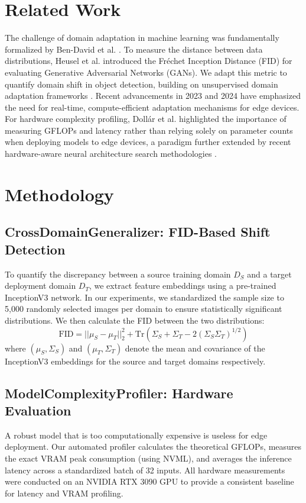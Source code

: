 \documentclass[conference]{IEEEtran}
\begin{document}
\section{Related Work}
The challenge of domain adaptation in machine learning was fundamentally formalized by Ben-David et al. \cite{ben2010theory}. To measure the distance between data distributions, Heusel et al. \cite{heusel2017gans} introduced the Fréchet Inception Distance (FID) for evaluating Generative Adversarial Networks (GANs). We adapt this metric to quantify domain shift in object detection, building on unsupervised domain adaptation frameworks \cite{tzeng2017adversarial, saito2019strong}. Recent advancements in 2023 and 2024 \cite{wang2023domain, zhang2024robust} have emphasized the need for real-time, compute-efficient adaptation mechanisms for edge devices. For hardware complexity profiling, Dollár et al. \cite{dollar2021fast} highlighted the importance of measuring GFLOPs and latency rather than relying solely on parameter counts when deploying models to edge devices, a paradigm further extended by recent hardware-aware neural architecture search methodologies \cite{chen2023hardware}.

\section{Methodology}

\subsection{CrossDomainGeneralizer: FID-Based Shift Detection}
To quantify the discrepancy between a source training domain $D_S$ and a target deployment domain $D_T$, we extract feature embeddings using a pre-trained InceptionV3 network. In our experiments, we standardized the sample size to 5,000 randomly selected images per domain to ensure statistically significant distributions. We then calculate the FID between the two distributions:
\begin{equation}
\text{FID} = ||\mu_S - \mu_T||_2^2 + \text{Tr}(\Sigma_S + \Sigma_T - 2(\Sigma_S \Sigma_T)^{1/2})
\end{equation}
where $(\mu_S, \Sigma_S)$ and $(\mu_T, \Sigma_T)$ denote the mean and covariance of the InceptionV3 embeddings for the source and target domains respectively.

\subsection{ModelComplexityProfiler: Hardware Evaluation}
A robust model that is too computationally expensive is useless for edge deployment. Our automated profiler calculates the theoretical GFLOPs, measures the exact VRAM peak consumption (using NVML), and averages the inference latency across a standardized batch of 32 inputs. All hardware measurements were conducted on an NVIDIA RTX 3090 GPU to provide a consistent baseline for latency and VRAM profiling.
\end{document}
